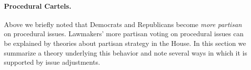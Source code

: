 


\paragraph{Procedural Cartels.}
\label{section:procural_cartel_theory}
Above we briefly noted that Democrats and Republicans become
\emph{more partisan} on procedural issues.  Lawmakers' more partisan
voting on procedural issues can be explained by theories about
partisan strategy in the House.  In this section we summarize a theory
underlying this behavior and note several ways in which it is
supported by issue adjustments.

